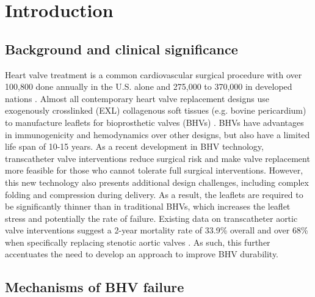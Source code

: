 

\section{Introduction}


\subsection{Background and clinical significance}

	Heart valve treatment is a common cardiovascular surgical procedure with over 100,800 done annually in the U.S. alone \cite{mozaffarian_heart_2016} and 275,000 to 370,000 in developed nations \cite{manji_future_2012}. Almost all contemporary heart valve replacement designs use exogenously crosslinked (EXL) collagenous soft tissues (e.g. bovine pericardium) to manufacture leaflets for bioprosthetic valves (BHVs) \cite{starr_artificial_2007, soares_biomechanical_2016}. BHVs have advantages in immunogenicity and hemodynamics over other designs, but also have a limited life span of 10-15 years. As a recent development in BHV technology, transcatheter valve interventions \cite{bonow_accaha_2006, guidoin_marvel_2010} reduce surgical risk and make valve replacement more feasible for those who cannot tolerate full surgical interventions. However, this new technology also presents additional design challenges, including complex folding and compression during delivery. As a result, the leaflets are required to be significantly thinner than in traditional BHVs, which increases the leaflet stress and potentially the rate of failure. Existing data on transcatheter aortic valve interventions suggest a 2-year mortality rate of 33.9\% overall \cite{mozaffarian_heart_2016} and over 68\% when specifically replacing stenotic aortic valves \cite{makkar_transcatheter_2012}. As such, this further accentuates the need to develop an approach to improve BHV durability. 
	
	 
\subsection{Mechanisms of BHV failure}

